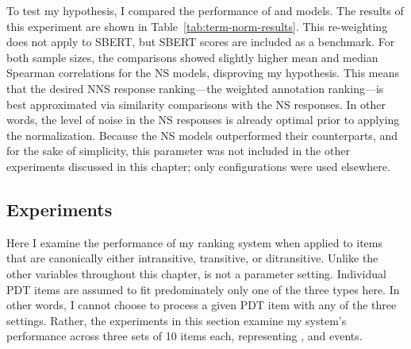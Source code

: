 To test my hypothesis, I compared the performance of  and  models. 
The results of this experiment are shown in Table~\ref{tab:term-norm-results}. This re-weighting does not apply to SBERT, but SBERT scores are included as a benchmark. For both sample sizes, the comparisons showed slightly higher mean and median Spearman correlations for the  NS models, disproving my hypothesis. This means that the desired NNS response ranking---the weighted annotation ranking---is best approximated via similarity comparisons with the  NS responses. In other words, the level of noise in the NS responses is already optimal prior to applying the normalization.
Because the  NS models outperformed their  counterparts, and for the sake of simplicity, this parameter was not included in the other experiments discussed in this chapter; only  configurations were used elsewhere.

\subsection{ Experiments}
\label{sec:exp-transitivity}
Here I examine the performance of my ranking system when applied to items that are canonically either intransitive, transitive, or ditransitive. Unlike the other variables throughout this chapter,  is not a parameter setting. Individual PDT items are assumed to fit predominately only one of the three types here. In other words, I cannot choose to process a given PDT item with any of the three  settings. Rather, the experiments in this section examine my system's performance across three sets of 10 items each, representing ,  and  events.


